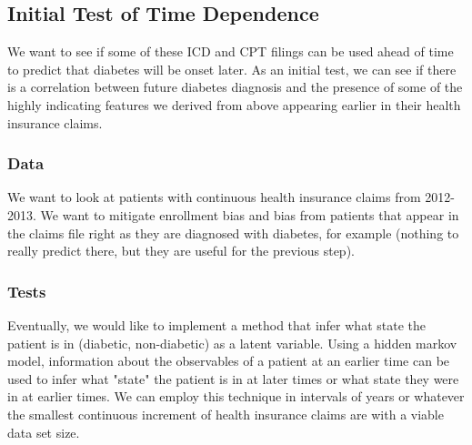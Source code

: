 \documentclass{article}
\begin{document}
\subsection{Initial Test of Time Dependence}

We want to see if some of these ICD and CPT filings can be used ahead of time to predict that diabetes will be onset later. As an initial test, we can see if there is a correlation between future diabetes diagnosis and the presence of some of the highly indicating features we derived from above appearing earlier in their health insurance claims.

\subsubsection{Data}

We want to look at patients with continuous health insurance claims from 2012-2013. We want to mitigate enrollment bias and bias from patients that appear in the claims file right as they are diagnosed with diabetes, for example (nothing to really predict there, but they are useful for the previous step). 

\subsubsection{Tests}

Eventually, we would like to implement a method that infer what state the patient is in (diabetic, non-diabetic) as a latent variable. Using a hidden markov model, information about the observables of a patient at an earlier time can be used to infer what "state" the patient is in at later times or what state they were in at earlier times. We can employ this technique in intervals of years or whatever the smallest continuous increment of health insurance claims are with a viable data set size.
\end{document}
